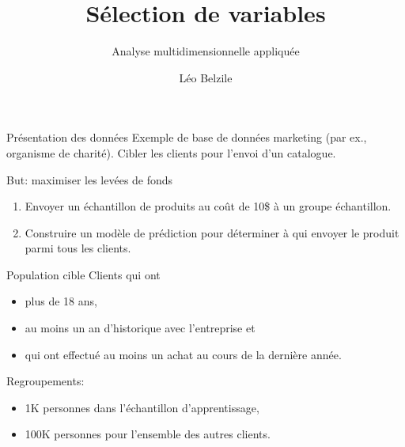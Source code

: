 \documentclass[
  ignorenonframetext,
]{beamer}
\title{Sélection de variables}
\subtitle{Analyse multidimensionnelle appliquée}
\author{Léo Belzile}
\date{}
\institute{HEC Montréal}
\providecommand{\tightlist}{%
  \setlength{\itemsep}{0pt}\setlength{\parskip}{0pt}}\usepackage{longtable,booktabs,array}
\begin{document}
\frame{\titlepage}
\ifdefined\Shaded\renewenvironment{Shaded}{\begin{tcolorbox}[boxrule=0pt, enhanced, breakable, interior hidden, borderline west={3pt}{0pt}{shadecolor}, sharp corners, frame hidden]}{\end{tcolorbox}}\fi

\begin{frame}{Présentation des données}
\protect\hypertarget{pruxe9sentation-des-donnuxe9es}{}
Exemple de base de données marketing (par ex., organisme de charité).
Cibler les clients pour l'envoi d'un catalogue.

But: maximiser les levées de fonds

\begin{enumerate}
\tightlist
\item
  Envoyer un échantillon de produits au coût de 10\$ à un groupe
  échantillon.
\item
  Construire un modèle de prédiction pour déterminer à qui envoyer le
  produit parmi tous les clients.
\end{enumerate}
\end{frame}

\begin{frame}{Population cible}
\protect\hypertarget{population-cible}{}
Clients qui ont

\begin{itemize}
\tightlist
\item
  plus de 18 ans,
\item
  au moins un an d'historique avec l'entreprise et
\item
  qui ont effectué au moins un achat au cours de la dernière année.
\end{itemize}

Regroupements:

\begin{itemize}
\tightlist
\item
  1K personnes dans l'échantillon d'apprentissage,
\item
  100K personnes pour l'ensemble des autres clients.
\end{itemize}
\end{frame}
\end{document}
